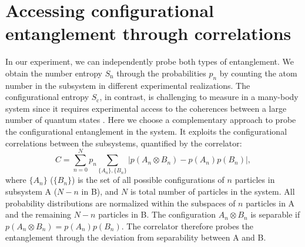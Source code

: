 \section{Accessing configurational entanglement through correlations}
In our experiment, we can independently probe both types of entanglement. We obtain the number entropy $S_\text{n}$ through the probabilities $p_n$ by counting the atom number in the subsystem in different experimental realizations. The configurational entropy $S_\text{c}$, in contrast, is challenging to measure in a many-body system since it requires experimental access to the coherences between a large number of quantum states \cite{Islam2015, Elben2017}. Here we choose a complementary approach to probe the configurational entanglement in the system. It exploits the configurational correlations between the subsystems, quantified by the correlator:
\begin{equation}
C = \sum_{n=0}^{N}p_n \sum_{\{A_{n}\},\{B_{n}\}}\left| p(A_{n} \otimes B_{n}) - p(A_{n}) p(B_{n}) \right| ,
\end{equation}
where $\{A_{n}\}$ ($\{B_{n}\}$) is the set of all possible configurations of $n$ particles in subsystem A ($N-n$ in B), and $N$ is total number of particles in the system. All probability distributions are normalized within the subspaces of $n$ particles in A and the remaining $N-n$ particles in B. The configuration $A_{n} \otimes B_{n}$ is separable if $p(A_{n} \otimes B_{n}) = p(A_{n}) p(B_{n})$. The correlator therefore probes the entanglement through the deviation from separability between A and B. 

